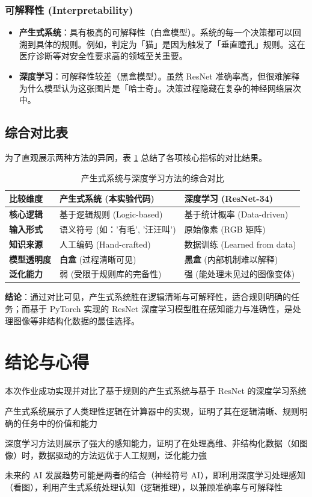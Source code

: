 \documentclass[supercite]{Experimental_Report}
\theoremstyle{definition}
\begin{document}
	\subsubsection{可解释性 (Interpretability)}
	\begin{itemize}
		\item \textbf{产生式系统}：具有极高的可解释性（白盒模型）。系统的每一个决策都可以回溯到具体的规则。例如，判定为「猫」是因为触发了「垂直瞳孔」规则。这在医疗诊断等对安全性要求高的领域至关重要。
		\item \textbf{深度学习}：可解释性较差（黑盒模型）。虽然 ResNet 准确率高，但很难解释为什么模型认为这张图片是「哈士奇」。决策过程隐藏在复杂的神经网络层次中。
	\end{itemize}
	
	\subsection{综合对比表}
	为了直观展示两种方法的异同，表 \ref{tab:comparison} 总结了各项核心指标的对比结果。
	
	\begin{table}[H]
		\centering
		\caption{产生式系统与深度学习方法的综合对比}
		\label{tab:comparison}
		\renewcommand{\arraystretch}{1.5} %
		\begin{tabular}{|m{3cm}|m{5cm}|m{5cm}|}
			\hline
			\textbf{比较维度} & \textbf{产生式系统 (本实验代码)} & \textbf{深度学习 (ResNet-34)} \\
			\hline
			\textbf{核心逻辑} & 基于逻辑规则 (Logic-based) & 基于统计概率 (Data-driven) \\
			\hline
			\textbf{输入形式} & 语义符号 (如：'有毛', '汪汪叫') & 原始像素 (RGB 矩阵) \\
			\hline
			\textbf{知识来源} & 人工编码 (Hand-crafted) & 数据训练 (Learned from data) \\
			\hline
			\textbf{模型透明度} & \textbf{白盒} (过程清晰可见) & \textbf{黑盒} (内部机制难以解释) \\
			\hline
			\textbf{泛化能力} & 弱 (受限于规则库的完备性) & 强 (能处理未见过的图像变体) \\
			\hline
		\end{tabular}
	\end{table}
	
	\vspace{1em}
	\noindent\textbf{结论}：通过对比可见，产生式系统胜在逻辑清晰与可解释性，适合规则明确的任务；而基于 PyTorch 实现的 ResNet 深度学习模型胜在感知能力与准确性，是处理图像等非结构化数据的最佳选择。
	
	\section{结论与心得}
	本次作业成功实现并对比了基于规则的产生式系统与基于 ResNet 的深度学习系统
	
	产生式系统展示了人类理性逻辑在计算器中的实现，证明了其在逻辑清晰、规则明确的任务中的价值和能力
	
	深度学习方法则展示了强大的感知能力，证明了在处理高维、非结构化数据（如图像）时，数据驱动的方法远优于人工规则，泛化能力強
	
	未来的 AI 发展趋势可能是两者的结合（神经符号 AI），即利用深度学习处理感知（看图），利用产生式系统处理认知（逻辑推理），以兼顾准确率与可解释性
\end{document}
